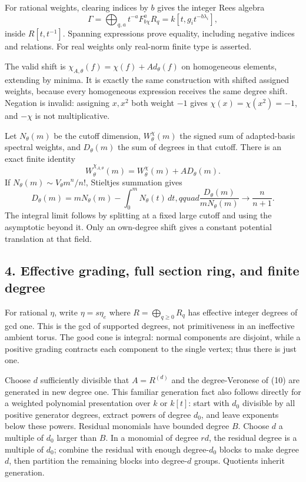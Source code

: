 \documentclass[
  11pt,
]{article}
\begin{document}
For rational weights, clearing indices by \(b\) gives the integer Rees
algebra \[ \Gamma=\bigoplus_{q,a} t^{-a}F^a_{b\chi}R_q
       =k[t,g_it^{-b\lambda_i}],                                      \tag{10}\]
inside \(R[t,t^{-1}]\). Spanning expressions prove equality, including
negative indices and relations. For real weights only real-norm finite
type is asserted.

The valid shift is \(\chi_{A,\theta}(f)=\chi(f)+A d_\theta(f)\) on
homogeneous elements, extending by minima. It is exactly the same
construction with shifted assigned weights, because every homogeneous
expression receives the same degree shift. Negation is invalid:
assigning \(x,x^2\) both weight \(-1\) gives \(\chi(x)=\chi(x^2)=-1\),
and \(-\chi\) is not multiplicative.

Let \(N_\theta(m)\) be the cutoff dimension, \(W_\theta^\chi(m)\) the
signed sum of adapted-basis spectral weights, and \(D_\theta(m)\) the
sum of degrees in that cutoff. There is an exact finite identity
\[ W_\theta^{\chi_{A,\theta}}(m)=W_\theta^\chi(m)+A D_\theta(m).            \tag{11}\]
If \(N_\theta(m)\sim V_\theta m^n/n!\), Stieltjes summation gives
\[ D_\theta(m)=mN_\theta(m)-\int_0^mN_\theta(t)\,dt,qquad
 \frac{D_\theta(m)}{mN_\theta(m)}\longrightarrow\frac n{n+1}.             \tag{12}\]
The integral limit follows by splitting at a fixed large cutoff and
using the asymptotic beyond it. Only an own-degree shift gives a
constant potential translation at that field.

\subsection{4. Effective grading, full section ring, and finite
degree}\label{effective-grading-full-section-ring-and-finite-degree}

For rational \(\eta\), write \(\eta=s\eta_e\) where
\(R=\bigoplus_{q\geq0}R_q\) has effective integer degrees of gcd one.
This is the gcd of supported degrees, not primitiveness in an
ineffective ambient torus. The good cone is integral: normal components
are disjoint, while a positive grading contracts each component to the
single vertex; thus there is just one.

Choose \(d\) sufficiently divisible that \(A=R^{(d)}\) and the
degree-Veronese of (10) are generated in new degree one. This familiar
generation fact also follows directly for a weighted polynomial
presentation over \(k\) or \(k[t]\): start with \(d_0\) divisible by all
positive generator degrees, extract powers of degree \(d_0\), and leave
exponents below these powers. Residual monomials have bounded degree
\(B\). Choose \(d\) a multiple of \(d_0\) larger than \(B\). In a
monomial of degree \(rd\), the residual degree is a multiple of \(d_0\);
combine the residual with enough degree-\(d_0\) blocks to make degree
\(d\), then partition the remaining blocks into degree-\(d\) groups.
Quotients inherit generation.
\end{document}
